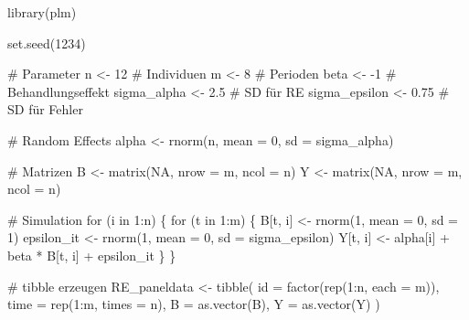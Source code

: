 \documentclass[
  a4paper,
  DIV=11,
  oneside]{scrreprt}
\newenvironment{Shaded}{\begin{snugshade}}{\end{snugshade}}
\newcommand{\AttributeTok}[1]{\textcolor[rgb]{0.40,0.45,0.13}{#1}}
\newcommand{\CommentTok}[1]{\textcolor[rgb]{0.37,0.37,0.37}{#1}}
\newcommand{\ConstantTok}[1]{\textcolor[rgb]{0.56,0.35,0.01}{#1}}
\newcommand{\ControlFlowTok}[1]{\textcolor[rgb]{0.00,0.23,0.31}{#1}}
\newcommand{\DecValTok}[1]{\textcolor[rgb]{0.68,0.00,0.00}{#1}}
\newcommand{\FloatTok}[1]{\textcolor[rgb]{0.68,0.00,0.00}{#1}}
\newcommand{\FunctionTok}[1]{\textcolor[rgb]{0.28,0.35,0.67}{#1}}
\newcommand{\NormalTok}[1]{\textcolor[rgb]{0.00,0.23,0.31}{#1}}
\newcommand{\OtherTok}[1]{\textcolor[rgb]{0.00,0.23,0.31}{#1}}
\newcommand{\SpecialCharTok}[1]{\textcolor[rgb]{0.37,0.37,0.37}{#1}}
\begin{document}
\begin{Shaded}
\begin{Highlighting}[]
\FunctionTok{library}\NormalTok{(plm)}

\FunctionTok{set.seed}\NormalTok{(}\DecValTok{1234}\NormalTok{)}

\CommentTok{\# Parameter}
\NormalTok{n }\OtherTok{\textless{}{-}} \DecValTok{12}  \CommentTok{\# Individuen}
\NormalTok{m }\OtherTok{\textless{}{-}} \DecValTok{8}   \CommentTok{\# Perioden}
\NormalTok{beta }\OtherTok{\textless{}{-}} \SpecialCharTok{{-}}\DecValTok{1} \CommentTok{\# Behandlungseffekt}
\NormalTok{sigma\_alpha }\OtherTok{\textless{}{-}} \FloatTok{2.5} \CommentTok{\# SD für RE}
\NormalTok{sigma\_epsilon }\OtherTok{\textless{}{-}} \FloatTok{0.75} \CommentTok{\# SD für Fehler}

\CommentTok{\# Random Effects}
\NormalTok{alpha }\OtherTok{\textless{}{-}} \FunctionTok{rnorm}\NormalTok{(n, }\AttributeTok{mean =} \DecValTok{0}\NormalTok{, }\AttributeTok{sd =}\NormalTok{ sigma\_alpha)}

\CommentTok{\# Matrizen}
\NormalTok{B }\OtherTok{\textless{}{-}} \FunctionTok{matrix}\NormalTok{(}\ConstantTok{NA}\NormalTok{, }\AttributeTok{nrow =}\NormalTok{ m, }\AttributeTok{ncol =}\NormalTok{ n)}
\NormalTok{Y }\OtherTok{\textless{}{-}} \FunctionTok{matrix}\NormalTok{(}\ConstantTok{NA}\NormalTok{, }\AttributeTok{nrow =}\NormalTok{ m, }\AttributeTok{ncol =}\NormalTok{ n)}

\CommentTok{\# Simulation}
\ControlFlowTok{for}\NormalTok{ (i }\ControlFlowTok{in} \DecValTok{1}\SpecialCharTok{:}\NormalTok{n) \{}
  \ControlFlowTok{for}\NormalTok{ (t }\ControlFlowTok{in} \DecValTok{1}\SpecialCharTok{:}\NormalTok{m) \{}
\NormalTok{    B[t, i] }\OtherTok{\textless{}{-}} \FunctionTok{rnorm}\NormalTok{(}\DecValTok{1}\NormalTok{, }\AttributeTok{mean =} \DecValTok{0}\NormalTok{, }\AttributeTok{sd =} \DecValTok{1}\NormalTok{)}
\NormalTok{    epsilon\_it }\OtherTok{\textless{}{-}} \FunctionTok{rnorm}\NormalTok{(}\DecValTok{1}\NormalTok{, }\AttributeTok{mean =} \DecValTok{0}\NormalTok{, }\AttributeTok{sd =}\NormalTok{ sigma\_epsilon)}
\NormalTok{    Y[t, i] }\OtherTok{\textless{}{-}}\NormalTok{ alpha[i] }\SpecialCharTok{+}\NormalTok{ beta }\SpecialCharTok{*}\NormalTok{ B[t, i] }\SpecialCharTok{+}\NormalTok{ epsilon\_it}
\NormalTok{  \}}
\NormalTok{\}}

\CommentTok{\# tibble erzeugen}
\NormalTok{RE\_paneldata }\OtherTok{\textless{}{-}} \FunctionTok{tibble}\NormalTok{(}
  \AttributeTok{id =} \FunctionTok{factor}\NormalTok{(}\FunctionTok{rep}\NormalTok{(}\DecValTok{1}\SpecialCharTok{:}\NormalTok{n, }\AttributeTok{each =}\NormalTok{ m)),}
  \AttributeTok{time =} \FunctionTok{rep}\NormalTok{(}\DecValTok{1}\SpecialCharTok{:}\NormalTok{m, }\AttributeTok{times =}\NormalTok{ n),}
  \AttributeTok{B =} \FunctionTok{as.vector}\NormalTok{(B),}
  \AttributeTok{Y =} \FunctionTok{as.vector}\NormalTok{(Y)}
\NormalTok{)}
\end{Highlighting}
\end{Shaded}
\end{document}

